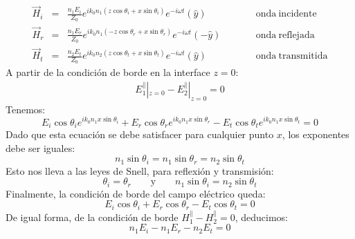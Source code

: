 \documentclass[letterpaper,10pt,english]{jupyterBook}
\begin{document}
\begin{eqnarray*}
\vec{H}_i &=& \frac{n_1E_i}{Z_0}e^{ ik_0n_1\left(z\cos\theta_i + x\sin\theta_i\right)}e^{-i\omega t}\left(\hat{y}\right)\quad\quad &&\mathrm{onda~incidente}
 \\
\vec{H}_r &=& \frac{n_1E_r}{Z_0} e^{ ik_0n_1\left(-z\cos\theta_r + x\sin\theta_r\right)}e^{-i\omega t} \left(-\hat{y}\right)\quad\quad &&\mathrm{onda~reflejada}
\\
\vec{H}_t &=& \frac{n_2E_t}{Z_0} e^{ ik_0n_2\left(z\cos\theta_t + x\sin\theta_t\right)}e^{-i\omega t} \left(\hat{y}\right)\quad\quad 
&&\mathrm{onda~transmitida}
\end{eqnarray*}
\sphinxAtStartPar
A partir de la condición de borde en la interface \(z =0\):
\begin{equation*}
\begin{split}E^{\parallel}_1|_{z=0} - E^{\parallel}_2|_{z=0} = 0\end{split}
\end{equation*}
\sphinxAtStartPar
Tenemos:
\begin{equation*}
E_i\cos\theta_i e^{ ik_0n_1x\sin\theta_i}+E_r\cos\theta_r e^{ ik_0n_1x\sin\theta_r} - E_t\cos\theta_t e^{ ik_0n_1x\sin\theta_t} = 0
\end{equation*}
\sphinxAtStartPar
Dado que esta ecuación se debe satisfacer para cualquier punto \(x\), los exponentes debe ser iguales:
\begin{equation*}
n_1\sin\theta_i = n_1\sin\theta_r = n_2\sin\theta_t
\end{equation*}
\sphinxAtStartPar
Esto nos lleva a las leyes de Snell, para reflexión y transmisión:
\begin{equation*}
\theta_i = \theta_r\quad\quad\mathrm{y}\quad\quad n_1\sin\theta_i = n_2\sin\theta_t
\end{equation*}
\sphinxAtStartPar
Finalmente, la condición de borde del campo eléctrico queda:
\label{equation:2_ondas_EM_en_la_materia/2_ondas_EM_en_la_materia:383ad7ea-5b2c-4df5-852c-58caaf807007}\begin{equation}\label{eq:boundaryE}
E_i\cos\theta_i +E_r\cos\theta_r  - E_t\cos\theta_t = 0
\end{equation}
\sphinxAtStartPar
De igual forma, de la condición de borde \(H^{\parallel}_1 - H^{\parallel}_2 = 0\), deducimos:
\label{equation:2_ondas_EM_en_la_materia/2_ondas_EM_en_la_materia:ce051e2a-0111-43e2-8021-3824091eafec}\begin{equation}
n_1E_i - n_1E_r  - n_2E_t = 0 \label{eq:boundaryH}
\end{equation}
\end{document}
